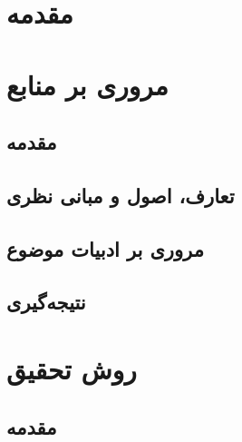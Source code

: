 \newpage

\chapter{مقدمه}


\newpage

\chapter{مروری بر منابع}
\section{مقدمه}
\section{تعارف، اصول و مبانی نظری}
\section{مروری بر ادبیات موضوع}
\section{نتیجه‌گیری}

\chapter{روش تحقیق}
\section{مقدمه}
